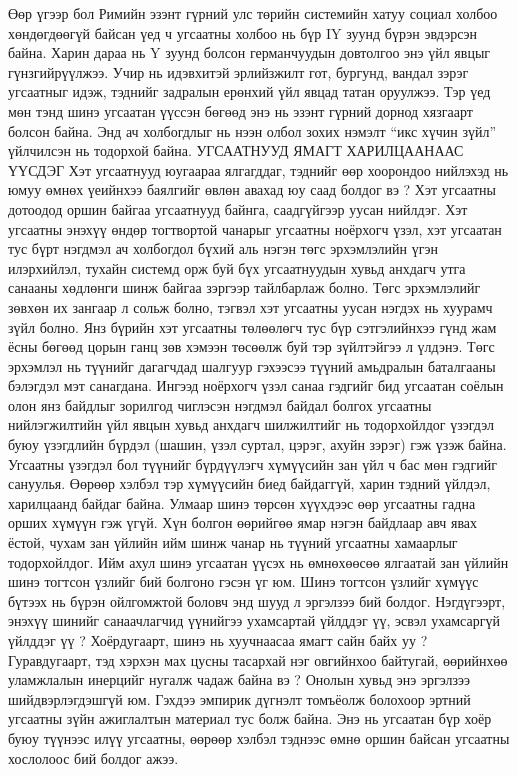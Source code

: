 Өөр үгээр бол Римийн эзэнт гүрний улс төрийн системийн хатуу социал холбоо хөндөгдөөгүй байсан үед ч угсаатны холбоо нь бүр IY зуунд бүрэн эвдэрсэн байна. Харин дараа нь Y зуунд болсон германчуудын довтолгоо энэ үйл явцыг гүнзгийрүүлжээ. Учир нь идэвхитэй эрлийзжилт гот, бургунд, вандал зэрэг угсаатныг идэж, тэднийг задралын ерөнхий үйл явцад татан оруулжээ. Тэр үед мөн тэнд шинэ угсаатан үүссэн бөгөөд энэ нь эзэнт гүрний дорнод хязгаарт болсон байна. Энд ач холбогдлыг нь нээн олбол зохих нэмэлт “икс хүчин зүйл” үйлчилсэн нь тодорхой байна.
УГСААТНУУД ЯМАГТ ХАРИЛЦААНААС ҮҮСДЭГ
Хэт угсаатнууд юугаараа ялгагддаг, тэднийг өөр хоорондоо нийлэхэд нь юмуу өмнөх үеийнхээ баялгийг өвлөн авахад юу саад болдог вэ ? Хэт угсаатны дотоодод оршин байгаа угсаатнууд байнга, саадгүйгээр уусан нийлдэг. Хэт угсаатны энэхүү өндөр тогтвортой чанарыг угсаатны ноёрхогч үзэл, хэт угсаатан тус бүрт нэгдмэл ач холбогдол бүхий аль нэгэн төгс эрхэмлэлийн үгэн илэрхийлэл, тухайн системд орж буй бүх угсаатнуудын хувьд анхдагч утга санааны хөдлөнги шинж байгаа зэргээр тайлбарлаж болно. Төгс эрхэмлэлийг зөвхөн их зангаар л сольж болно, тэгвэл хэт угсаатны уусан нэгдэх нь хуурамч зүйл болно. Янз бүрийн хэт угсаатны төлөөлөгч тус бүр сэтгэлийнхээ гүнд жам ёсны бөгөөд цорын ганц зөв хэмээн төсөөлж буй тэр зүйлтэйгээ л үлдэнэ. Төгс эрхэмлэл нь түүнийг дагагчдад шалгуур гэхээсээ түүний амьдралын баталгааны бэлэгдэл мэт санагдана. Ингээд ноёрхогч үзэл санаа гэдгийг бид угсаатан соёлын олон янз байдлыг зорилгод чиглэсэн нэгдмэл байдал болгох угсаатны нийлэгжилтийн үйл явцын хувьд анхдагч шилжилтийг нь тодорхойлдог үзэгдэл буюу үзэгдлийн бүрдэл (шашин, үзэл суртал, цэрэг, ахуйн зэрэг) гэж үзэж байна.
Угсаатны үзэгдэл бол түүнийг бүрдүүлэгч хүмүүсийн зан үйл ч бас мөн гэдгийг сануулья. Өөрөөр хэлбэл тэр хүмүүсийн биед байдаггүй, харин тэдний үйлдэл, харилцаанд байдаг байна. Улмаар шинэ төрсөн хүүхдээс өөр угсаатны гадна орших хүмүүн гэж үгүй. Хүн болгон өөрийгөө ямар нэгэн байдлаар авч явах ёстой, чухам зан үйлийн ийм шинж чанар нь түүний угсаатны хамаарлыг тодорхойлдог. Ийм ахул шинэ угсаатан үүсэх нь өмнөхөөсөө ялгаатай зан үйлийн шинэ тогтсон үзлийг бий болгоно гэсэн үг юм. Шинэ тогтсон үзлийг хүмүүс бүтээх нь бүрэн ойлгомжтой боловч энд шууд л эргэлзээ бий болдог. Нэгдүгээрт, энэхүү шинийг санаачлагчид үүнийгээ ухамсартай үйлддэг үү, эсвэл ухамсаргүй үйлддэг үү ? Хоёрдугаарт, шинэ нь хуучнаасаа ямагт сайн байх уу ? Гуравдугаарт, тэд хэрхэн мах цусны тасархай нэг овгийнхоо байтугай, өөрийнхөө уламжлалын инерцийг нугалж чадаж байна вэ ? Онолын хувьд энэ эргэлзээ шийдвэрлэгдэшгүй юм. Гэхдээ эмпирик дүгнэлт томъёолж болохоор эртний угсаатны зүйн ажиглалтын материал тус болж байна. Энэ нь угсаатан бүр хоёр буюу түүнээс илүү угсаатны, өөрөөр хэлбэл тэднээс өмнө оршин байсан угсаатны хослолоос бий болдог ажээ.

